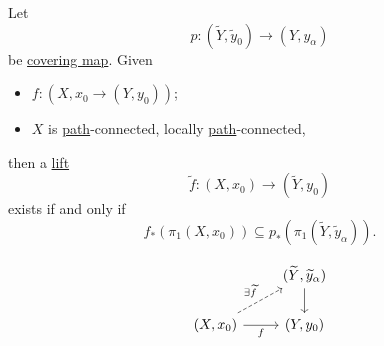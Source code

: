 \begin{proposition}
	Let
	\[
		p\colon (\widetilde{Y} , \widetilde{y} _0)\to (Y, y_\alpha )
	\]
	be \hyperref[def:covering-space]{covering map}. Given
	\begin{itemize}
		\item \(f\colon (X, x_0 \to (Y, y_0))\);
		\item \(X\) is \hyperref[def:path]{path}-connected, locally \hyperref[def:path]{path}-connected,
	\end{itemize}
	then a \hyperref[prop:homotopy-lifting-property]{lift}
	\[
		\widetilde{f} \colon (X, x_0)\to (\widetilde{Y} , y_0)
	\]
	exists if and only if
	\[
		f_*\left(\pi _1(X, x_0)\right)\subseteq p_*\left(\pi _1(\widetilde{Y} , \widetilde{y} _\alpha )\right).
	\]

	\[
		\begin{tikzcd}
			& {(\widetilde{Y}, \widetilde{y}_\alpha)} \\
			{(X, x_0)} & {(Y, y_0)}
			\arrow[from=1-2, to=2-2]
			\arrow["f"', from=2-1, to=2-2]
			\arrow["{\exists \widetilde{f}}", dashed, from=2-1, to=1-2]
		\end{tikzcd}
	\]
\end{proposition}